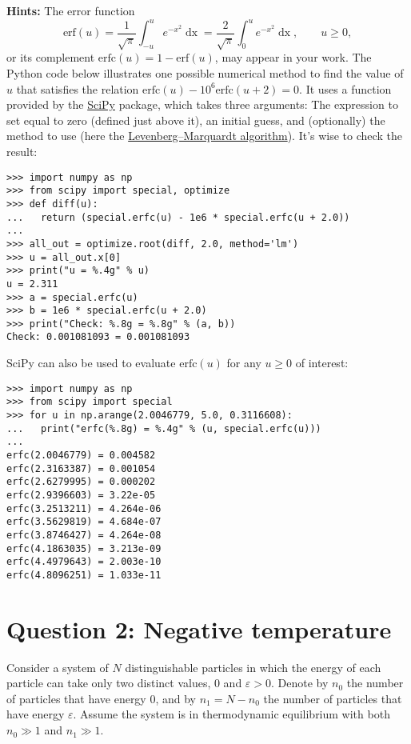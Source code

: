 \documentclass[12 pt]{article} %
\newcommand{\eps}{\ensuremath{\varepsilon} }
\renewcommand{\d}[1]{\ensuremath{\mathop{d#1}} }
\begin{document}
\vfill
\noindent \textbf{Hints:} The error function
\begin{equation*}
  \mathrm{erf}(u) = \frac{1}{\sqrt{\pi}} \int_{-u}^u e^{-x^2} \d{x} = \frac{2}{\sqrt{\pi}} \int_0^u e^{-x^2} \d{x}, \qquad u \geq 0,
\end{equation*}
or its complement $\mathrm{erfc}(u) = 1 - \mathrm{erf}(u)$, may appear in your work.
The Python code below illustrates one possible numerical method to find the value of $u$ that satisfies the relation $\mathrm{erfc}(u) - 10^6 \mathrm{erfc}(u + 2) = 0$.
It uses a function provided by the \href{https://scipy.org}{SciPy} package, which takes three arguments:
The expression to set equal to zero (defined just above it), an initial guess, and (optionally) the method to use (here the \href{https://en.wikipedia.org/wiki/Levenberg-Marquardt_algorithm}{Levenberg--Marquardt algorithm}).
It's wise to check the result: \\[-30 pt]
\begin{verbatim}
>>> import numpy as np
>>> from scipy import special, optimize
>>> def diff(u):
...   return (special.erfc(u) - 1e6 * special.erfc(u + 2.0))
...
>>> all_out = optimize.root(diff, 2.0, method='lm')
>>> u = all_out.x[0]
>>> print("u = %.4g" % u)
u = 2.311
>>> a = special.erfc(u)
>>> b = 1e6 * special.erfc(u + 2.0)
>>> print("Check: %.8g = %.8g" % (a, b))
Check: 0.001081093 = 0.001081093
\end{verbatim}
\newpage
\noindent SciPy can also be used to evaluate $\mathrm{erfc}(u)$ for any $u \geq 0$ of interest: \\[-30 pt]
\begin{verbatim}
>>> import numpy as np
>>> from scipy import special
>>> for u in np.arange(2.0046779, 5.0, 0.3116608):
...   print("erfc(%.8g) = %.4g" % (u, special.erfc(u)))
...
erfc(2.0046779) = 0.004582
erfc(2.3163387) = 0.001054
erfc(2.6279995) = 0.000202
erfc(2.9396603) = 3.22e-05
erfc(3.2513211) = 4.264e-06
erfc(3.5629819) = 4.684e-07
erfc(3.8746427) = 4.264e-08
erfc(4.1863035) = 3.213e-09
erfc(4.4979643) = 2.003e-10
erfc(4.8096251) = 1.033e-11
\end{verbatim}



\vfill
\section*{Question 2: Negative temperature}
Consider a system of $N$ distinguishable particles in which the energy of each particle can take only two distinct values, $0$ and $\eps > 0$.
Denote by $n_0$ the number of particles that have energy $0$, and by $n_1 = N - n_0$ the number of particles that have energy $\eps$.
Assume the system is in thermodynamic equilibrium with both $n_0 \gg 1$ and $n_1 \gg 1$.
\end{document}
